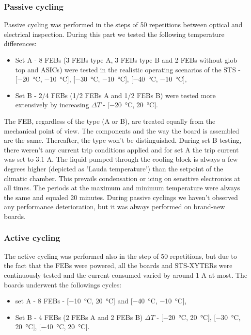 \subsubsection{Passive cycling}
Passive cycling was performed in the steps of 50 repetitions between optical and electrical inspection. During this part we tested the following temperature differences:
\begin{itemize}
    \item Set A - 8 \glspl{FEB} (3 \glspl{FEB} type A, 3 \glspl{FEB} type B and 2 \glspl{FEB} without glob top and \glspl{ASIC}) were tested in the realistic operating scenarios of the \gls{STS} - [\SI{-20}{\celsius}, \SI{-10}{\celsius}], [\SI{-30}{\celsius}, \SI{-10}{\celsius}], [\SI{-40}{\celsius}, \SI{-10}{\celsius}],
    \item Set B - 2/4 \glspl{FEB} (1/2 \glspl{FEB} A and 1/2 \glspl{FEB} B) were tested more extensively by increasing $\Delta T$ - [\SI{-20}{\celsius}, \SI{20}{\celsius}].
\end{itemize}
The \gls{FEB}, regardless of the type (A or B), are treated equally from the mechanical point of view. The components and the way the board is assembled are the same. Thereafter, the type won't be distinguished. During set B testing, there weren't any current trip conditions applied and for set A the trip current was set to 3.1 A. 
The liquid pumped through the cooling block is always a few degrees higher (depicted as 'Lauda temperature') than the setpoint of the climatic chamber. This prevails condensation or icing on sensitive electronics at all times. The periods at the maximum and minimum temperature were always the same and equaled 20 minutes. During passive cyclings we haven't observed any performance deterioration, but it was always performed on brand-new boards.

\subsubsection{Active cycling}
The active cycling was performed also in the step of 50 repetitions, but due to the fact that the \glspl{FEB} were powered, all the boards and STS-XYTERs were continuously tested and the current consumed varied by around 1 A at most. The boards underwent the followings cycles:
\begin{itemize}
    \item set A - 8 \glspl{FEB} - [\SI{-10}{\celsius}, \SI{20}{\celsius}] and [\SI{-40}{\celsius}, \SI{-10}{\celsius}],
    \item Set B - 4 \glspl{FEB} (2 \glspl{FEB} A and 2 \glspl{FEB} B)  $\Delta T$ - [\SI{-20}{\celsius}, \SI{20}{\celsius}], [\SI{-30}{\celsius}, \SI{20}{\celsius}], [\SI{-40}{\celsius}, \SI{20}{\celsius}].
\end{itemize}


